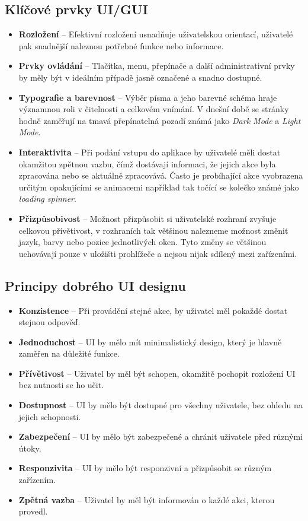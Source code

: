 \subsection*{Klíčové prvky UI/GUI}
\label{subsec:ui-gui-theory-key-elements}
\begin{itemize}
    \item \textbf{Rozložení} -- Efektivní rozložení usnadňuje uživatelskou orientací, uživatelé pak snadnější naleznou potřebné funkce nebo informace.
    \item \textbf{Prvky ovládání} -- Tlačítka, menu, přepínače a další administrativní prvky by měly být v ideálním případě jasně označené a snadno dostupné.
    \item \textbf{Typografie a barevnost} -- Výběr písma a jeho barevné schéma hraje významnou roli v čitelnosti a celkovém vnímání. V dnešní době se stránky hodně zaměřují na tmavá přepínatelná pozadí známá jako \textit{Dark Mode} a \textit{Light Mode}.
    \item \textbf{Interaktivita} -- Při podání vstupu do aplikace by uživatelé měli dostat okamžitou zpětnou vazbu, čímž dostávají informaci, že jejich akce byla zpracována nebo se aktuálně zpracovává. Často je probíhající akce vyobrazena určitým opakujícími se animacemi například tak točící se kolečko známé jako \textit{loading spinner}.
    \item \textbf{Přizpůsobivost} -- Možnost přizpůsobit si uživatelské rozhraní zvyšuje celkovou přívětivost, v rozhraních tak většinou nalezneme možnost změnit jazyk, barvy nebo pozice jednotlivých oken. Tyto změny se většinou uchovávají pouze v uložišti prohlížeče a nejsou nijak sdílený mezi zařízeními.
\end{itemize}

\subsection*{Principy dobrého UI designu}
\label{subsec:ui-gui-theore-basic-use-case}
\begin{itemize}
    \item \textbf{Konzistence} -- Při provádění stejné akce, by uživatel měl pokaždé dostat stejnou odpověď.
    \item \textbf{Jednoduchost} -- UI by mělo mít minimalistický design, který je hlavně zaměřen na důležité funkce.
    \item \textbf{Přívětivost} -- Uživatel by měl být schopen, okamžitě pochopit rozložení UI bez nutnosti se ho učit.
    \item \textbf{Dostupnost} -- UI by mělo být dostupné pro všechny uživatele, bez ohledu na jejich schopnosti.
    \item \textbf{Zabezpečení} -- UI by mělo být zabezpečené a chránit uživatele před různými útoky.
    \item \textbf{Responzivita} -- UI by mělo být responzivní a přizpůsobit se různým zařízením.
    \item \textbf{Zpětná vazba} -- Uživatel by měl být informován o každé akci, kterou provedl.
\end{itemize}

